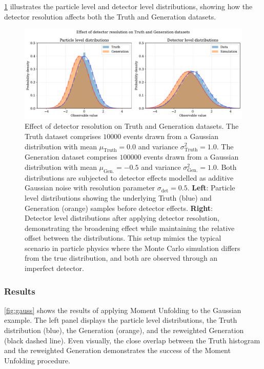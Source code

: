             \cref{fig:gaussian-setup} illustrates the particle level and detector level distributions, showing how the detector resolution affects both the Truth and Generation datasets.
\begin{figure}
    \centering
    \includegraphics[width=\textwidth]{figures/chapter-05/gaussian-setup.pdf}
    \caption[Effect of detector resolution on Truth and Generation datasets]{%
        Effect of detector resolution on Truth and Generation datasets. 
        The Truth dataset comprises $\num{10000}$ events drawn from a Gaussian distribution 
        with mean $\mu_{\textrm{Truth}} = 0.0$ and variance $\sigma^2_{\textrm{Truth}} = 1.0$. 
        The Generation dataset comprises $\num{100000}$ events drawn from a Gaussian distribution 
        with mean $\mu_{\textrm{Gen.}} = -0.5$ and variance $\sigma^2_{\textrm{Gen.}} = 1.0$. 
        Both distributions are subjected to detector effects modelled as additive Gaussian noise 
        with resolution parameter $\sigma_{\textrm{det}} = 0.5$. 
        \textbf{Left}: Particle level distributions showing the underlying Truth (blue) and 
        Generation (orange) samples before detector effects. 
        \textbf{Right}: Detector level distributions after applying detector resolution, 
        demonstrating the broadening effect while maintaining the relative offset between 
        the distributions. This setup mimics the typical scenario in particle physics where 
        the Monte Carlo simulation differs from the true distribution, and both are observed 
        through an imperfect detector.%
    }
    \label{fig:gaussian-setup}
\end{figure}
        \subsubsection{Results}
            \cref{fig:gauss} shows the results of applying Moment Unfolding to the Gaussian example.
            The left panel displays the particle level distributions, the Truth distribution (blue), the Generation (orange), and the reweighted Generation (black dashed line). 
            Even visually, the close overlap between the Truth histogram and the reweighted Generation demonstrates the success of the Moment Unfolding procedure.

